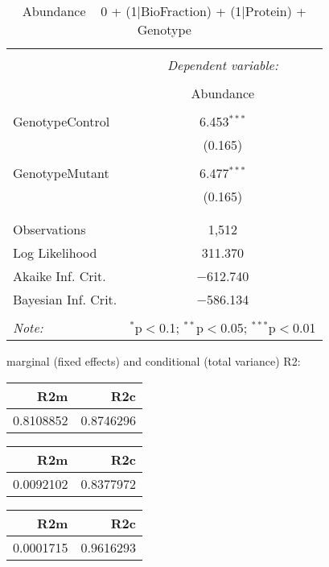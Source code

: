 \documentclass[11pt]{report}
\begin{document}
\begin{table}[!htbp] \centering 
  \caption{Abundance ~ 0 + (1|BioFraction) + (1|Protein) + Genotype} 
  \label{} 
\begin{tabular}{@{\extracolsep{5pt}}lc} 
\\[-1.8ex]\hline 
\hline \\[-1.8ex] 
 & \multicolumn{1}{c}{\textit{Dependent variable:}} \\ 
\cline{2-2} 
\\[-1.8ex] & Abundance \\ 
\hline \\[-1.8ex] 
 GenotypeControl & 6.453$^{***}$ \\ 
  & (0.165) \\ 
  & \\ 
 GenotypeMutant & 6.477$^{***}$ \\ 
  & (0.165) \\ 
  & \\ 
\hline \\[-1.8ex] 
Observations & 1,512 \\ 
Log Likelihood & 311.370 \\ 
Akaike Inf. Crit. & $-$612.740 \\ 
Bayesian Inf. Crit. & $-$586.134 \\ 
\hline 
\hline \\[-1.8ex] 
\textit{Note:}  & \multicolumn{1}{r}{$^{*}$p$<$0.1; $^{**}$p$<$0.05; $^{***}$p$<$0.01} \\ 
\end{tabular} 
\end{table} 
marginal (fixed effects) and conditional (total variance) R2:

\begin{tabular}{r|r}
\hline
R2m & R2c\\
\hline
0.8108852 & 0.8746296\\
\hline
\end{tabular}

\begin{tabular}{r|r}
\hline
R2m & R2c\\
\hline
0.0092102 & 0.8377972\\
\hline
\end{tabular}

\begin{tabular}{r|r}
\hline
R2m & R2c\\
\hline
0.0001715 & 0.9616293\\
\hline
\end{tabular}
\end{document}
